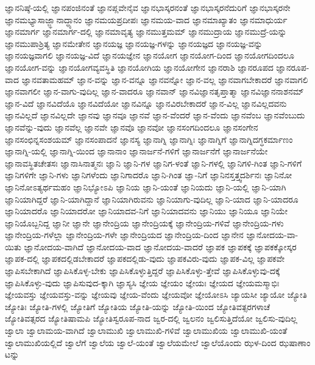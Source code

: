 {ಜ್ಞಾನನಿಷ್ಠೆ-ಯಲ್ಲಿ
ಜ್ಞಾನಪಂಜಿನಂತೆ
ಜ್ಞಾನಪ್ಲವೇನೈವ
ಜ್ಞಾನಭಾಸ್ಕರನಂತೆ
ಜ್ಞಾನಭಾಸ್ಕರನೆದುರಿಗೆ
ಜ್ಞಾನಭಾಸ್ಕರನೇ
ಜ್ಞಾನಮಭ್ಯಾಸಾಜ್ಜ್ಞಾನಾದ್ಧ್ಯಾನಂ
ಜ್ಞಾನಮಯಪ್ರದೀಪಃ
ಜ್ಞಾನಮಯ-ವಾದ
ಜ್ಞಾನಮಾಖ್ಯಾತಂ
ಜ್ಞಾನಮಾಧುರ್ಯ
ಜ್ಞಾನಮಾರ್ಗ
ಜ್ಞಾನಮಾರ್ಗ-ದಲ್ಲಿ
ಜ್ಞಾನಮಾವೃತ್ಯ
ಜ್ಞಾನಮುತ್ತಮಮ್
ಜ್ಞಾನಮುದ್ರಾಯ
ಜ್ಞಾನಮುದ್ರೆ-ಯನ್ನು
ಜ್ಞಾನಮುಪಾಶ್ರಿತ್ಯ
ಜ್ಞಾನಮೇತೇನ
ಜ್ಞಾನಯಜ್ಞ
ಜ್ಞಾನಯಜ್ಞ-ಗಳನ್ನು
ಜ್ಞಾನಯಜ್ಞದ
ಜ್ಞಾನಯಜ್ಞ-ವನ್ನು
ಜ್ಞಾನಯಜ್ಞವಾಗಲಿ
ಜ್ಞಾನಯಜ್ಞ-ವಿದೆ
ಜ್ಞಾನಯಜ್ಞೇನ
ಜ್ಞಾನಯೋಗ
ಜ್ಞಾನಯೋಗ-ದಿಂದ
ಜ್ಞಾನಯೋಗದಿಂದಲೂ
ಜ್ಞಾನಯೋಗ-ವನ್ನು
ಜ್ಞಾನಯೋಗವ್ಯವಸ್ಥಿತಿ
ಜ್ಞಾನಯೋಗಿಯ
ಜ್ಞಾನಯೋಗೇನ
ಜ್ಞಾನರಾಶಿ
ಜ್ಞಾನರೂಪದ
ಜ್ಞಾನರೂಪ-ವಾದ
ಜ್ಞಾನವತಾಮಹಮ್
ಜ್ಞಾನ-ವನ್ನು
ಜ್ಞಾನ-ವನ್ನೂ
ಜ್ಞಾನವನ್ನೋ
ಜ್ಞಾನ-ವಲ್ಲ
ಜ್ಞಾನವಾಗಬೇಕಾದರೆ
ಜ್ಞಾನವಾಗಲಿ
ಜ್ಞಾನವಾಗಲೀ
ಜ್ಞಾನ-ವಾಗು-ವುದಿಲ್ಲ
ಜ್ಞಾನ-ವಾದರೂ
ಜ್ಞಾನವಾನ್
ಜ್ಞಾನವಿಜ್ಞಾನತೃಪ್ತಾತ್ಮಾ
ಜ್ಞಾನವಿಜ್ಞಾನನಾಶನಮ್
ಜ್ಞಾನ-ವಿದೆ
ಜ್ಞಾನವಿದೆಯೊ
ಜ್ಞಾನವಿದೆಯೋ
ಜ್ಞಾನವಿನ್ನೂ
ಜ್ಞಾನವಿರಬೇಕಾದರೆ
ಜ್ಞಾನ-ವಿಲ್ಲ
ಜ್ಞಾನವಿಲ್ಲದವನು
ಜ್ಞಾನವಿಲ್ಲದೆ
ಜ್ಞಾನವಿಲ್ಲದೇ
ಜ್ಞಾನವು
ಜ್ಞಾನವೂ
ಜ್ಞಾನವೆ
ಜ್ಞಾನ-ವೆಂದರೆ
ಜ್ಞಾನ-ವೆಂದು
ಜ್ಞಾನವೆಂಬ
ಜ್ಞಾನವೆಂಬುದು
ಜ್ಞಾನವೆನ್ನು-ವುದು
ಜ್ಞಾನವೆಲ್ಲ
ಜ್ಞಾನವೇ
ಜ್ಞಾನವೊ
ಜ್ಞಾನವೋ
ಜ್ಞಾನಸಂಗದಿಂದಲೂ
ಜ್ಞಾನಸಂಗೇನ
ಜ್ಞಾನಸಂಛಿನ್ನಸಂಶಯಮ್
ಜ್ಞಾನಸಂಪಾದನೆ
ಜ್ಞಾನಸ್ಯ
ಜ್ಞಾನಾಗ್ನಿ
ಜ್ಞಾನಾಗ್ನಿಃ
ಜ್ಞಾನಾಗ್ನಿಗೆ
ಜ್ಞಾನಾಗ್ನಿದಗ್ಧಕರ್ಮಾಣಂ
ಜ್ಞಾನಾಗ್ನಿ-ಯಲ್ಲಿ
ಜ್ಞಾನಾಗ್ನಿ-ಯಿಂದ
ಜ್ಞಾನಾನಾಂ
ಜ್ಞಾನಾರ್ಜನೆ-ಗಳಿಗೆ
ಜ್ಞಾನಾರ್ಜನೆಗೆ
ಜ್ಞಾನಾರ್ಜನೆಯೇ
ಜ್ಞಾನಾವಸ್ಥಿತಚೇತಸಃ
ಜ್ಞಾನಾಸಿನಾತ್ಮನಃ
ಜ್ಞಾನಿ
ಜ್ಞಾನಿ-ಗಳ
ಜ್ಞಾನಿಗ-ಳಂತೆ
ಜ್ಞಾನಿ-ಗಳಲ್ಲಿ
ಜ್ಞಾನಿಗಳಿ-ಗಿಂತ
ಜ್ಞಾನಿ-ಗಳಿಗೆ
ಜ್ಞಾನಿಗಳಿಗೇ
ಜ್ಞಾನಿ-ಗಳು
ಜ್ಞಾನಿಗಳೆಂದು
ಜ್ಞಾನಿಗಾದರೊ
ಜ್ಞಾನಿ-ಗಿಂತ
ಜ್ಞಾ-ನಿಗೆ
ಜ್ಞಾನಿನಸ್ತತ್ತ್ವದರ್ಶಿನಃ
ಜ್ಞಾನಿನೋ
ಜ್ಞಾನಿನೋಽತ್ಯರ್ಥಮಹಂ
ಜ್ಞಾನಿಭ್ಯೋಽಪಿ
ಜ್ಞಾನಿಯ
ಜ್ಞಾನಿ-ಯಂತೆ
ಜ್ಞಾನಿಯದು
ಜ್ಞಾನಿ-ಯಲ್ಲಿ
ಜ್ಞಾನಿ-ಯಾಗಿ
ಜ್ಞಾನಿಯಾಗಿದ್ದರೆ
ಜ್ಞಾನಿ-ಯಾಗಿದ್ದಾನೆ
ಜ್ಞಾನಿಯಾಗಿರುವನು
ಜ್ಞಾನಿಯಾಗು-ವುದಿಲ್ಲ
ಜ್ಞಾನಿ-ಯಾದ
ಜ್ಞಾನಿ-ಯಾದರೂ
ಜ್ಞಾನಿಯಾದರೊ
ಜ್ಞಾನಿಯಾದರೋ
ಜ್ಞಾನಿಯಾದವ-ನಿಗೆ
ಜ್ಞಾನಿಯಾದವನು
ಜ್ಞಾನಿಯು
ಜ್ಞಾನಿಯೂ
ಜ್ಞಾನಿಯೇ
ಜ್ಞಾನಿಯೊಬ್ಬನಿದ್ದ
ಜ್ಞಾನೀ
ಜ್ಞಾನೇ
ಜ್ಞಾನೇಂದ್ರಿಯ
ಜ್ಞಾನೇಂದ್ರಿಯಕ್ಕೆ
ಜ್ಞಾನೇಂದ್ರಿಯ-ಗಳಿವೆ
ಜ್ಞಾನೇಂದ್ರಿಯ-ಗಳು
ಜ್ಞಾನೇಂದ್ರಿಯ-ಗಳೆಲ್ಲಾ
ಜ್ಞಾನೇಂದ್ರಿಯ-ಗಳೇ
ಜ್ಞಾನೇಂದ್ರಿಯದ
ಜ್ಞಾನೇಂದ್ರಿಯ-ದಿಂದ
ಜ್ಞಾನೇನ
ಜ್ಞಾನೋದಯ-ವಾ-ಯಿತು
ಜ್ಞಾನೋದಯ-ವಾಗಿದೆ
ಜ್ಞಾನೋದಯ-ವಾದ
ಜ್ಞಾನೋದಯ-ವಾದರೆ
ಜ್ಞಾಪಕ
ಜ್ಞಾಪಕಕ್ಕೆ
ಜ್ಞಾಪಕಕ್ಕೋಸ್ಕರ
ಜ್ಞಾಪಕ-ದಲ್ಲಿ
ಜ್ಞಾಪಕದಲ್ಲಿಡಬೇಕಾದರೆ
ಜ್ಞಾಪಕದಲ್ಲಿಡು-ವುದು
ಜ್ಞಾಪಕವಿರು-ವುದು
ಜ್ಞಾಪಕ-ವಿಲ್ಲ
ಜ್ಞಾಪಕವೇ
ಜ್ಞಾಪಿಸಬೇಕಾಗಿದೆ
ಜ್ಞಾಪಿಸಿಕೊಳ್ಳ-ಬೇಕು
ಜ್ಞಾಪಿಸಿಕೊಳ್ಳುತ್ತಿದ್ದರೆ
ಜ್ಞಾಪಿಸಿಕೊಳ್ಳು-ತ್ತೇವೆ
ಜ್ಞಾಪಿಸಿಕೊಳ್ಳುವು-ದಕ್ಕೆ
ಜ್ಞಾಪಿಸಿಕೊಳ್ಳು-ವುದು
ಜ್ಞಾಪಿಸುವುದ-ಕ್ಕಾಗಿ
ಜ್ಞಾಸ್ಯಸಿ
ಜ್ಞೇಯ
ಜ್ಞೇಯಂ
ಜ್ಞೇಯಃ
ಜ್ಞೇಯದ
ಜ್ಞೇಯಮಸ್ಮಾಭಿಃ
ಜ್ಞೇಯವಸ್ತು
ಜ್ಞೇಯವಸ್ತು-ವನ್ನು
ಜ್ಞೇಯವು
ಜ್ಞೇಯ-ವೆಂದು
ಜ್ಞೇಯವೋ
ಜ್ಞೇಯೋಽಸಿ
ಜ್ಯಾಯಸೀ
ಜ್ಯಾಯೋ
ಜ್ಯೋತಿ
ಜ್ಯೋತಿಃ
ಜ್ಯೋತಿ-ಗಳಲ್ಲಿ
ಜ್ಯೋತಿಗೆ
ಜ್ಯೋತಿಯ
ಜ್ಯೋತಿ-ಯನ್ನು
ಜ್ಯೋತಿ-ಯಿಂದ
ಜ್ಯೋತಿವತ್ಸರಗಳಾಚೆ
ಜ್ಯೋತಿವತ್ಸರದ
ಜ್ಯೋತಿಷಾಮಪಿ
ಜ್ಯೋತಿಸ್ವರೂಪ-ನಾದ
ಜ್ವರ-ದಲ್ಲಿ
ಜ್ವಲನಂ
ಜ್ವಲಿಸುತ್ತಿದೆಯೋ
ಜ್ವಲಿಸು-ವುದಿಲ್ಲ
ಜ್ವಾಲಾ
ಜ್ವಾಲಾಮಯ-ವಾಗಿದೆ
ಜ್ವಾಲಾಮುಖಿ
ಜ್ವಾಲಾಮುಖಿ-ಗಳಿವೆ
ಜ್ವಾಲಾಮುಖಿಯ
ಜ್ವಾಲಾಮುಖಿ-ಯಂತೆ
ಜ್ವಾಲಾಮುಖಿಯಲ್ಲಿದೆ
ಜ್ವಾಲೆಗೆ
ಜ್ವಾಲೆಯ
ಜ್ವಾಲೆ-ಯಂತೆ
ಜ್ವಾಲೆಯಮೇಲೆ
ಜ್ವಾಲೆಯೊಂದು
ಝಳ-ದಿಂದ
ಝಷಾಣಾಂ
ಟನ್ನು
}
